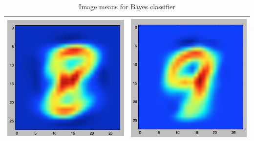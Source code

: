 \documentclass[11pt]{article}
\begin{document}
\begin{table}[!th]
\begin{tabular}{|c|c|}
\includegraphics[scale=.15]{images/bayes8.png} & \includegraphics[scale=.15]{images/bayes9.png} \\
\hline
\end{tabular}
\caption{Image means for Bayes classifier}
\label{ex:table}
\end{table}
\end{document}
